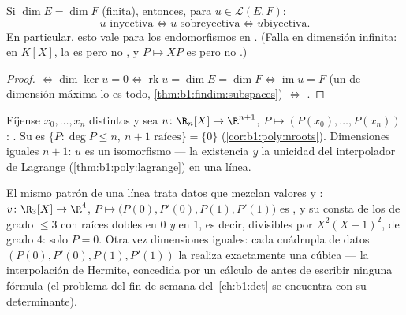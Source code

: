 \begin{corollary}\label{cor:b1:linmaps:samedim}
Si $\dim E = \dim F$ (finita), entonces, para $u \in \mathcal{L}(E, F)$:
\[
u \text{ inyectiva} \iff u \text{ sobreyectiva} \iff u \text{
biyectiva}.
\]
En particular, esto vale para los endomorfismos en .
(Falla en dimensión infinita: en $K[X]$, la  es 
pero no , y $P \mapsto XP$ es  pero no
.)
\end{corollary}

\begin{proof}
 $\iff \dim\ker u = 0 \iff \operatorname{rk} u = \dim E =
\dim F \iff \operatorname{im} u = F$ (un  de dimensión
máxima lo es todo, \cref{thm:b1:findim:subspaces}) $\iff$
.
\end{proof}

\begin{example}\label{ex:b1:linmaps:interpolation}
Fíjense $x_0, \dots, x_n$ distintos y sea
$u \colon \R_n[X] \to \R^{n+1}$,
$P \mapsto (P(x_0), \dots, P(x_n))$: . Su  es
$\{P : \deg P \leq n,\ n+1 \text{ raíces}\} = \{0\}$
(\cref{cor:b1:poly:nroots}). Dimensiones iguales $n + 1$: $u$ es un
isomorfismo --- la existencia \emph{y} la unicidad del interpolador
de Lagrange (\cref{thm:b1:poly:lagrange}) en una línea.

El mismo patrón de una línea trata datos que mezclan valores y
: $v \colon \R_3[X] \to \R^4$,
$P \mapsto \bigl(P(0), P'(0), P(1), P'(1)\bigr)$ es , y su
 consta de los  de grado $\leq 3$ con raíces dobles
en $0$ \emph{y} en $1$, es decir, divisibles por $X^2(X-1)^2$, de
grado $4$: solo $P = 0$. Otra vez dimensiones iguales: cada cuádrupla
de datos $(P(0), P'(0), P(1), P'(1))$ la realiza exactamente una
cúbica --- la interpolación de Hermite, concedida por un cálculo de
 antes de escribir ninguna fórmula (el problema del fin de
semana del~\cref{ch:b1:det} se encuentra con su determinante).
\end{example}


